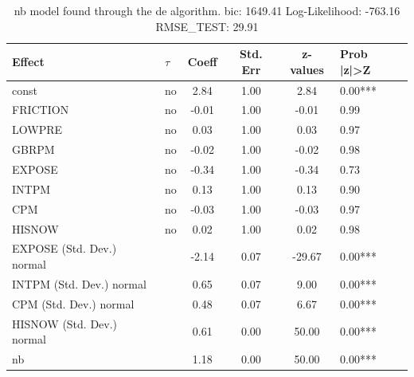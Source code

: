 \begin{table}
	\caption{nb model found through the de algorithm. bic: 1649.41 Log-Likelihood: -763.16 RMSE_TEST: 29.91}
	\begin{center}
		\begin{tabular}{|l|l|c|c|c|l|}
			\hline
			Effect & $\tau$ & Coeff & Std. Err & z-values & Prob |z|>Z \\
			\hline
			const & no & 2.84 & 1.00 & 2.84 & 0.00*** \\
			\hline
			FRICTION & no & -0.01 & 1.00 & -0.01 & 0.99 \\
			\hline
			LOWPRE & no & 0.03 & 1.00 & 0.03 & 0.97 \\
			\hline
			GBRPM & no & -0.02 & 1.00 & -0.02 & 0.98 \\
			\hline
			EXPOSE & no & -0.34 & 1.00 & -0.34 & 0.73 \\
			\hline
			INTPM & no & 0.13 & 1.00 & 0.13 & 0.90 \\
			\hline
			CPM & no & -0.03 & 1.00 & -0.03 & 0.97 \\
			\hline
			HISNOW & no & 0.02 & 1.00 & 0.02 & 0.98 \\
			\hline
			EXPOSE (Std. Dev.) normal &  & -2.14 & 0.07 & -29.67 & 0.00*** \\
			\hline
			INTPM (Std. Dev.) normal &  & 0.65 & 0.07 & 9.00 & 0.00*** \\
			\hline
			CPM (Std. Dev.) normal &  & 0.48 & 0.07 & 6.67 & 0.00*** \\
			\hline
			HISNOW (Std. Dev.) normal &  & 0.61 & 0.00 & 50.00 & 0.00*** \\
			\hline
			nb &  & 1.18 & 0.00 & 50.00 & 0.00*** \\
			\hline
		\end{tabular}
	\end{center}
\end{table}